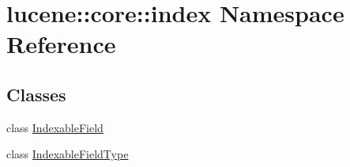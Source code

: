 \hypertarget{namespacelucene_1_1core_1_1index}{}\section{lucene\+:\+:core\+:\+:index Namespace Reference}
\label{namespacelucene_1_1core_1_1index}
\subsection*{Classes}
\begin{DoxyCompactItemize}
\item 
class \mbox{\hyperlink{classlucene_1_1core_1_1index_1_1IndexableField}{Indexable\+Field}}
\item 
class \mbox{\hyperlink{classlucene_1_1core_1_1index_1_1IndexableFieldType}{Indexable\+Field\+Type}}
\end{DoxyCompactItemize}
